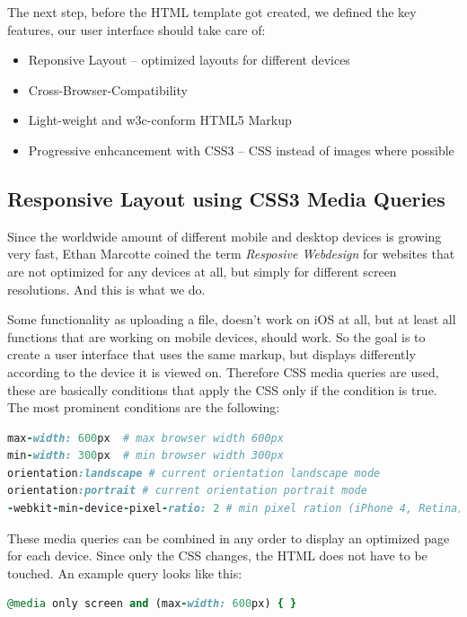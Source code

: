 The next step, before the HTML template got created, we defined the key features, our user interface should take care of:

\begin{itemize}
\item Reponsive Layout – optimized layouts for different devices
\item Cross-Browser-Compatibility
\item Light-weight and w3c-conform HTML5 Markup
\item Progressive enhcancement with CSS3 – CSS instead of images where possible
\end{itemize}

\subsection{Responsive Layout using CSS3 Media Queries}

Since the worldwide amount of different mobile and desktop devices is growing very fast, Ethan Marcotte coined the term
\textit{Resposive Webdesign}\citep{Marcotte2011} for websites that are not optimized for any devices at all, but  
simply for different screen resolutions. And this is what we do. 

Some functionality as uploading a file, doesn't work on iOS at 
all, but at least 
all functions that are working on mobile devices, should work. So the goal is to create a user interface that uses the 
same markup, but displays differently according to the device it is viewed on. Therefore CSS media queries are used, 
these are 
basically conditions that apply the CSS only if the condition is true. The most prominent conditions are 
the following:

\begingroup 
\begin{lstlisting}[caption=CSS Media Queries, label=list:cssMediaQueries, language=Ruby]
max-width: 600px  # max browser width 600px
min-width: 300px  # min browser width 300px
orientation:landscape # current orientation landscape mode
orientation:portrait # current orientation portrait mode
-webkit-min-device-pixel-ratio: 2 # min pixel ration (iPhone 4, Retina)
\end{lstlisting}
\endgroup

These media queries can be combined in any order to display an optimized page for each device. Since only the CSS 
changes, the HTML does not have to be touched. An example query looks like this: 

\begin{lstlisting}[caption=CSS Media Query, label=list:cssMediaQuery, language=Ruby]
@media only screen and (max-width: 600px) { }
\end{lstlisting}

